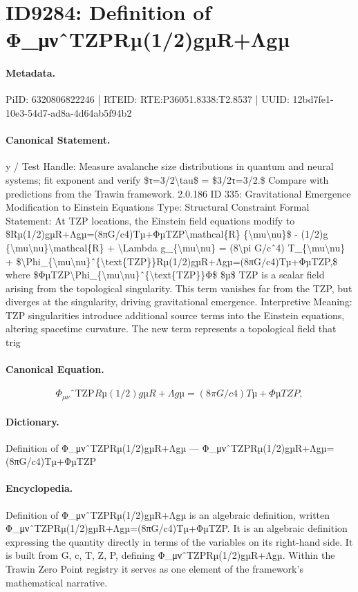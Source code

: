 \section*{ID9284: Definition of Φ\_μνˆTZPRµ(1/2)gµR+Λgµ}
\paragraph{Metadata.}
PiID: 6320806822246 | RTEID: RTE:P36051.8338:T2.8537 | UUID: 12bd7fe1-10e3-54d7-ad8a-4d64ab5f94b2

\paragraph{Canonical Statement.}
y / Test Handle: Measure avalanche size distributions in quantum and neural systems; fit exponent and verify \$τ=3/2\textbackslash{}tau\$ = \$3/2τ=3/2.\$ Compare with predictions from the Trawin framework. 2.0.186 ID 335: Gravitational Emergence Modification to Einstein Equations Type: Structural Constraint Formal Statement: At TZP locations, the Einstein field equations modify to \$Rµ(1/2)gµR+Λgµ=(8πG/c4)Tµ+ΦµTZP\textbackslash{}mathcal\{R\} \{\textbackslash{}mu\textbackslash{}nu\}\$ - (1/2)g \{\textbackslash{}mu\textbackslash{}nu\}\textbackslash{}mathcal\{R\} + \textbackslash{}Lambda g\_\{\textbackslash{}mu\textbackslash{}nu\} = (8\textbackslash{}pi G/cˆ4) T\_\{\textbackslash{}mu\textbackslash{}nu\} + \$\textbackslash{}Phi\_\{\textbackslash{}mu\textbackslash{}nu\}ˆ\{\textbackslash{}text\{TZP\}\}Rµ(1/2)gµR+Λgµ=(8πG/c4)Tµ+ΦµTZP,\$ where \$ΦµTZP\textbackslash{}Phi\_\{\textbackslash{}mu\textbackslash{}nu\}ˆ\{\textbackslash{}text\{TZP\}\}Φ\$ \$µ\$ TZP is a scalar field arising from the topological singularity. This term vanishes far from the TZP, but diverges at the singularity, driving gravitational emergence. Interpretive Meaning: TZP singularities introduce additional source terms into the Einstein equations, altering spacetime curvature. The new term represents a topological field that trig

\paragraph{Canonical Equation.}
\[
\Phi_{\mu\nu}ˆ{\text{TZP}}Rµ(1/2)gµR+Λgµ=(8πG/c4)Tµ+ΦµTZP,
\]

\paragraph{Dictionary.}
Definition of Φ\_μνˆTZPRµ(1/2)gµR+Λgµ — Φ\_μνˆTZPRµ(1/2)gµR+Λgµ=(8πG/c4)Tµ+ΦµTZP

\paragraph{Encyclopedia.}
Definition of Φ\_μνˆTZPRµ(1/2)gµR+Λgµ is an algebraic definition, written Φ\_μνˆTZPRµ(1/2)gµR+Λgµ=(8πG/c4)Tµ+ΦµTZP. It is an algebraic definition expressing the quantity directly in terms of the variables on its right-hand side. It is built from G, c, T, Z, P, defining Φ\_μνˆTZPRµ(1/2)gµR+Λgµ. Within the Trawin Zero Point registry it serves as one element of the framework's mathematical narrative.
